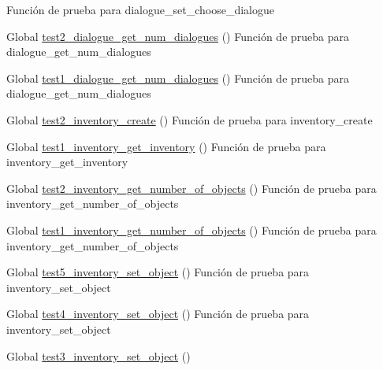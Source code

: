 \begin{DoxyRefList}
%
Función de prueba para dialogue\+\_\+set\+\_\+choose\+\_\+dialogue  
\item[Global \mbox{\hyperlink{dialogue__test_8c_a5725b4c30d9351e1b7aa05239fb38abd}{test2\+\_\+dialogue\+\_\+get\+\_\+num\+\_\+dialogues}} ()]\label{test__test000040}%
%
Función de prueba para dialogue\+\_\+get\+\_\+num\+\_\+dialogues  
\item[Global \mbox{\hyperlink{dialogue__test_8c_acffd021daed239774cb3a1e83e556824}{test1\+\_\+dialogue\+\_\+get\+\_\+num\+\_\+dialogues}} ()]\label{test__test000039}%
%
Función de prueba para dialogue\+\_\+get\+\_\+num\+\_\+dialogues  
\item[Global \mbox{\hyperlink{inventory__test_8c_a73a6080c360a8870c4ffc734e989c8b3}{test2\+\_\+inventory\+\_\+create}} ()]\label{test__test000066}%
%
Función de prueba para inventory\+\_\+create  
\item[Global \mbox{\hyperlink{inventory__test_8c_a4fabef11aa72defe00459c078ae42af4}{test1\+\_\+inventory\+\_\+get\+\_\+inventory}} ()]\label{test__test000075}%
%
Función de prueba para inventory\+\_\+get\+\_\+inventory  
\item[Global \mbox{\hyperlink{inventory__test_8c_afb66a921e4bd9b8df05b0c2fcbbc9649}{test2\+\_\+inventory\+\_\+get\+\_\+number\+\_\+of\+\_\+objects}} ()]\label{test__test000074}%
%
Función de prueba para inventory\+\_\+get\+\_\+number\+\_\+of\+\_\+objects  
\item[Global \mbox{\hyperlink{inventory__test_8c_a8ae9f8ddebed8f6dfcda767c1715076d}{test1\+\_\+inventory\+\_\+get\+\_\+number\+\_\+of\+\_\+objects}} ()]\label{test__test000073}%
%
Función de prueba para inventory\+\_\+get\+\_\+number\+\_\+of\+\_\+objects  
\item[Global \mbox{\hyperlink{inventory__test_8c_af3214c45d3ebaefe862514acb977a418}{test5\+\_\+inventory\+\_\+set\+\_\+object}} ()]\label{test__test000072}%
%
Función de prueba para inventory\+\_\+set\+\_\+object  
\item[Global \mbox{\hyperlink{inventory__test_8c_a64b2d92f50bb388e75bb03355aa8b5eb}{test4\+\_\+inventory\+\_\+set\+\_\+object}} ()]\label{test__test000071}%
%
Función de prueba para inventory\+\_\+set\+\_\+object  
\item[Global \mbox{\hyperlink{inventory__test_8c_afeec9d3504d3663c7fb8884e1bb1562d}{test3\+\_\+inventory\+\_\+set\+\_\+object}} ()]\label{test__test000070}%

\end{DoxyRefList}

